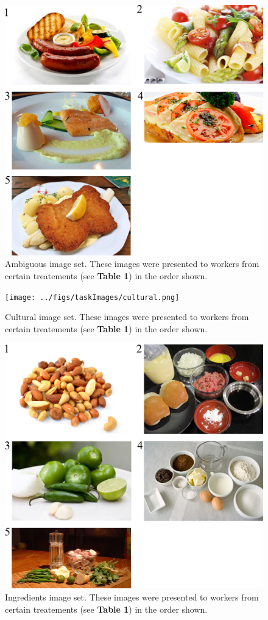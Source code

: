 \documentclass[a4paper]{report}
\begin{document}
\begin{figure}
	\includegraphics[scale=1.00]{../figs/taskImages/ambiguous.png}
	\caption{ Ambiguous image set. These images were presented to workers from 
		certain treatements (see \textbf{Table 1}) in the order shown.}
\end{figure}

\begin{figure}
	\texttt{[image: ../figs/taskImages/cultural.png]}
	\caption{Cultural image set. These images were presented to workers from 
		certain treatements (see \textbf{Table 1}) in the order shown.}
\end{figure}

\begin{figure}
	\includegraphics[scale=1.00]{../figs/taskImages/ingredients.png}
	\caption{ Ingredients image set. These images were presented to workers 
		from certain treatements (see \textbf{Table 1}) in the order shown.}
\end{figure}
\end{document}
